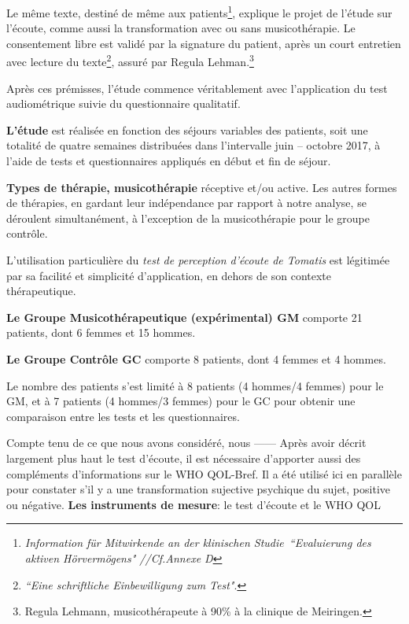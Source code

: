 Le même texte, destiné de même aux
patients\footnote{ \emph{Information für Mitwirkende an der klinischen
  Studie\  ``Evaluierung des aktiven Hörvermögens" //Cf.Annexe D}
}, explique le projet de l'étude sur l'écoute, comme aussi la transformation
avec ou sans musicothérapie.
Le consentement libre est validé par la signature du patient, après
un court entretien avec lecture du texte\footnote{\emph{``Eine schriftliche Einbewilligung zum
    Test"}.}, assuré par  Regula Lehman.\footnote{Regula
  Lehmann, musicothérapeute  à 90\%  à la clinique de Meiringen.} 


Après ces prémisses, l'étude commence véritablement avec l'application du test
audiométrique suivie du questionnaire qualitatif.

\textbf{L'étude }est
réalisée en fonction des séjours variables des patients, soit une
totalité  de quatre semaines
distribuées dans l'intervalle juin --
octobre 2017,  à l'aide de tests et questionnaires appliqués en début
et fin de séjour.

\textbf{Types de thérapie, musicothérapie} réceptive et/ou active.
Les autres formes de thérapies, en gardant
leur indépendance par rapport à notre analyse, se déroulent simultanément, à
l'exception de la musicothérapie pour le groupe contrôle.

L'utilisation particulière du \textit{test de perception d'écoute de Tomatis}  est
légitimée par sa facilité et  simplicité d'application, en dehors de
son contexte thérapeutique.






\textbf{Le Groupe Musicothérapeutique (expérimental) GM} comporte 21
patients, dont 6
femmes et 15 hommes.


\textbf{Le  Groupe Contrôle GC} comporte 8 patients, dont 4 femmes et 4 hommes.


Le nombre
des patients s'est limité  à 8
patients (4 hommes/4 femmes) pour le GM, et à 7 patients (4 hommes/3
femmes) pour le GC pour obtenir une comparaison entre les tests et les questionnaires.




Compte tenu de ce que nous avons considéré, nous ------
 Après avoir décrit largement plus haut le test d'écoute, il est nécessaire d'apporter aussi des compléments d'informations sur le WHO QOL-Bref. Il a été
 utilisé ici en parallèle pour constater s'il y a une transformation sujective psychique du sujet,
 positive ou négative.
\textbf{ Les instruments de mesure}: le test  d'écoute et le WHO QOL

